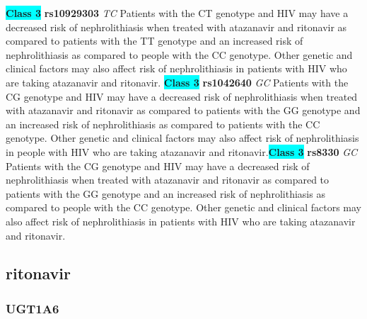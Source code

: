 \documentclass{book}
\begin{document}
\begin{center}
\textbf{\colorbox{cyan} {Class 3}} \textbf{ rs10929303 } \textit{ TC }
Patients with the CT genotype and HIV may have a decreased risk of nephrolithiasis when treated with atazanavir and ritonavir as compared to patients with the TT genotype and an increased risk of nephrolithiasis as compared to people with the CC genotype. Other genetic and clinical factors may also affect risk of nephrolithiasis in patients with HIV who are taking atazanavir and ritonavir. \textbf{\colorbox{cyan} {Class 3}} \textbf{ rs1042640 } \textit{ GC }
Patients with the CG genotype and HIV may have a decreased risk of nephrolithiasis when treated with atazanavir and ritonavir as compared to patients with the GG genotype and an increased risk of nephrolithiasis as compared to patients with the CC genotype. Other genetic and clinical factors may also affect risk of nephrolithiasis in people with HIV who are taking atazanavir and ritonavir.\textbf{\colorbox{cyan} {Class 3}} \textbf{ rs8330 } \textit{ GC }
Patients with the CG genotype and HIV may have a decreased risk of nephrolithiasis when treated with atazanavir and ritonavir as compared to patients with the GG genotype and an increased risk of nephrolithiasis as compared to people with the CC genotype. Other genetic and clinical factors may also affect risk of nephrolithiasis in patients with HIV who are taking atazanavir and ritonavir.


\end{center}\subsection{ ritonavir }


\subsubsection{ UGT1A6 }
\end{document}
